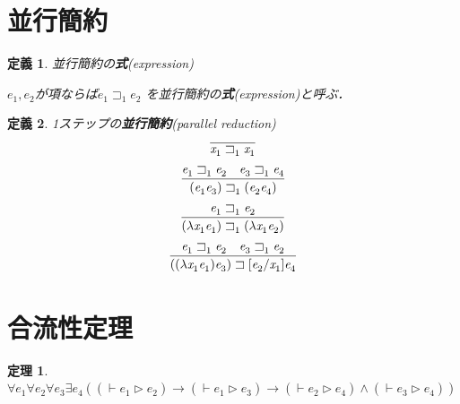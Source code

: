 \documentclass{ltjsbook}%
\newtheorem{theorem}{定理}[section]%
\newtheorem{definition}{定義}[section]%
\newcommand\term[2]{\textbf{#1}{(\textit{#2})}}%
\begin{document}
\section{並行簡約}%
\label{sect:par}%
\begin{definition}%
並行簡約の\term{式}{expression}%
\par$\mathit{e}_1^{},\mathit{e}_2^{}$が項ならば$\mathit{e}_1^{}\sqsupset_1^{}\mathit{e}_2^{}$%
を並行簡約の\term{式}{expression}と呼ぶ．%
\end{definition}%
\begin{definition}%
1ステップの\term{並行簡約}{parallel reduction}%
\begin{equation}%
  \infer{%
    \mathit{x}_1^{}\sqsupset_1^{}\mathit{x}_1^{}%
  }{%
  }%
\end{equation}%
\begin{equation}%
  \infer{%
    (\mathit{e}_1^{}\mathit{e}_3^{})\sqsupset_1^{}(\mathit{e}_2^{}\mathit{e}_4^{})%
  }{%
    \mathit{e}_1^{}\sqsupset_1^{}\mathit{e}_2^{}%
  &%
    \mathit{e}_3^{}\sqsupset_1^{}\mathit{e}_4^{}%
  }%
\end{equation}%
\begin{equation}%
  \infer{%
    (\lambda\mathit{x}_1^{}\mathit{e}_1^{})\sqsupset_1^{}%
    (\lambda\mathit{x}_1^{}\mathit{e}_2^{})%
  }{%
    \mathit{e}_1^{}\sqsupset_1^{}\mathit{e}_2^{}%
  }%
\end{equation}%
\begin{equation}%
  \infer{%
    ((\lambda\mathit{x}_1^{}\mathit{e}_1^{})\mathit{e}_3^{})\sqsupset%
    [\mathit{e}_2^{}/\mathit{x}_1^{}]\mathit{e}_4^{}%
  }{%
    \mathit{e}_1^{}\sqsupset_1^{}\mathit{e}_2^{}%
  &%
    \mathit{e}_3^{}\sqsupset_1^{}\mathit{e}_2^{}%
  }%
\end{equation}%
\end{definition}%
\section{合流性定理}%
\label{sect:cr}%
\begin{theorem}%
  $\forall\mathit{e}_1^{}\forall\mathit{e}_2^{}\forall\mathit{e}_3^{}\exists\mathit{e}_4^{}%
  ((\vdash\mathit{e}_1^{}\triangleright\mathit{e}_2^{})\rightarrow%
  (\vdash\mathit{e}_1^{}\triangleright\mathit{e}_3^{})\rightarrow%
  (\vdash\mathit{e}_2^{}\triangleright\mathit{e}_4^{})\land%
  (\vdash\mathit{e}_3^{}\triangleright\mathit{e}_4^{}))$%
\end{theorem}%
\backmatter%
\end{document}
